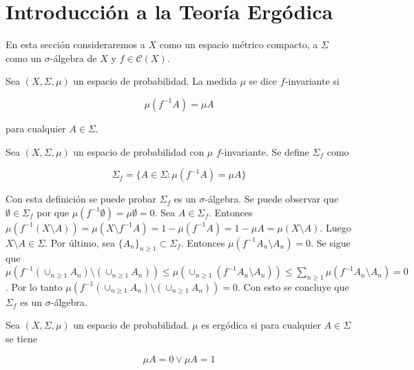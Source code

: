 \section{Introducción a la Teoría Ergódica}

En esta sección consideraremos a $X$ como un espacio métrico compacto, a $\Sigma$ como un $\sigma$-álgebra de $X$ y $f \in \mathcal{C}(X)$.

\begin{definicion}
	Sea $(X,\Sigma,\mu)$ un espacio de probabilidad. La medida $\mu$ se dice $f$-invariante si
	
	\begin{equation}
		\mu(f^{-1}A) = \mu A
	\end{equation}
	
	para cualquier $A \in \Sigma$.
\end{definicion}

\begin{definicion}
	Sea $(X,\Sigma,\mu)$ un espacio de probabilidad  con $\mu$ $f$-invariante. Se define $\Sigma_f$ como
	
	\begin{equation}
		\Sigma_f = \{ A \in \Sigma: \mu(f^{-1}A) = \mu A \}
	\end{equation}
\end{definicion}

Con esta definición se puede probar $\Sigma_f$ es un $\sigma$-álgebra. Se puede observar que $\emptyset \in \Sigma_f$ por que $\mu(f^{-1} \emptyset) = \mu \emptyset = 0$. Sea $A \in \Sigma_f$. Entonces $\mu(f^{-1}(X \setminus A)) =  \mu(X \setminus f^{-1}A) = 1 - \mu(f^{-1}A) = 1 - \mu A = \mu(X \setminus A)$. Luego $X \setminus A \in \Sigma$. Por último, sea $\{A_n\}_{n \geq 1} \subset \Sigma_f$. Entonces $\mu(f^{-1}A_n \setminus A_n) = 0$. Se sigue que $\mu(f^{-1}(\cup_{n \geq 1} A_n) \setminus (\cup_{n \geq 1} A_n)) \leq \mu(\cup_{n \geq 1} (f^{-1}A_n \setminus A_n)) \leq \sum_{n \geq 1} \mu(f^{-1}A_n \setminus A_n) = 0$. Por lo tanto $\mu(f^{-1}(\cup_{n \geq 1} A_n) \setminus (\cup_{n \geq 1} A_n)) = 0$. Con esto se concluye que $\Sigma_f$ es un $\sigma$-álgebra. 

\begin{definicion}
	Sea $(X,\Sigma,\mu)$ un espacio de probabilidad. $\mu$ es ergódica si para cualquier $A \in \Sigma$ se tiene
	
	\begin{equation}
		\mu A = 0 \vee \mu A = 1
	\end{equation}
\end{definicion}

